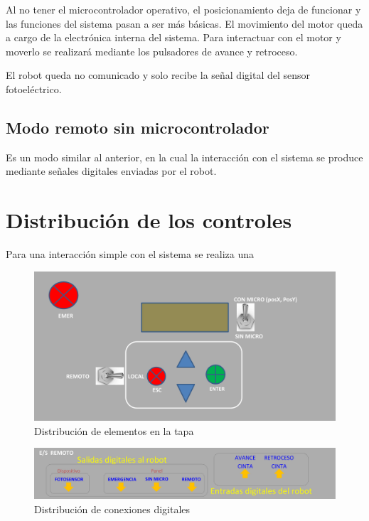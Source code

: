 Al no tener el microcontrolador operativo, el posicionamiento deja de funcionar y las funciones del
sistema pasan a ser más básicas. El movimiento del motor queda a cargo de la electrónica interna del
sistema. Para interactuar con el motor y moverlo se realizará mediante los pulsadores de avance y 
retroceso.

El robot queda no comunicado y solo recibe la señal digital del sensor fotoeléctrico.

\subsection{Modo remoto sin microcontrolador}\label{subsec-04}

Es un modo similar al anterior, en la cual la interacción con el sistema se produce mediante señales
digitales enviadas por el robot.

\section{Distribución de los controles}

Para una interacción simple con el sistema se realiza una

\begin{figure}[htbp]
	\centering
	\includegraphics[scale=0.5]{01-introduccion/01-botonera.jpg}
	\caption{Distribución de elementos en la tapa}
	\label{fig:figura11}
	\end{figure}

\begin{figure}[htbp]
	\centering
	\includegraphics[scale=0.5]{01-introduccion/02-digitales.jpg}
	\caption{Distribución de conexiones digitales}
	\label{fig:figura12}
	\end{figure}